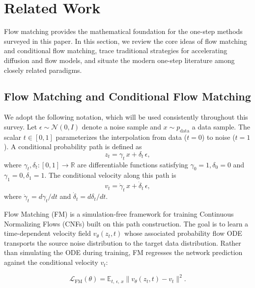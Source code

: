\section{Related Work}
\label{sec:related}

Flow matching provides the mathematical foundation for the one-step methods surveyed in this paper. In this section, we review the core ideas of flow matching and conditional flow matching, trace traditional strategies for accelerating diffusion and flow models, and situate the modern one-step literature among closely related paradigms.

\subsection{Flow Matching and Conditional Flow Matching}
\label{subsec:fm-cfm}

We adopt the following notation, which will be used consistently throughout this survey. Let $\epsilon \sim \mathcal{N}(0, I)$ denote a noise sample and $x \sim p_{\text{data}}$ a data sample. The scalar $t \in [0,1]$ parameterizes the interpolation from data ($t=0$) to noise ($t=1$). A conditional probability path is defined as
\begin{equation}
    z_t = \gamma_t \, x + \delta_t \, \epsilon,
    \label{eq:general-path}
\end{equation}
where $\gamma_t, \delta_t \colon [0,1] \to \mathbb{R}$ are differentiable functions satisfying $\gamma_0 = 1, \delta_0 = 0$ and $\gamma_1 = 0, \delta_1 = 1$. The conditional velocity along this path is
\begin{equation}
    v_t = \dot{\gamma}_t \, x + \dot{\delta}_t \, \epsilon,
    \label{eq:general-vel}
\end{equation}
where $\dot{\gamma}_t = d\gamma_t/dt$ and $\dot{\delta}_t = d\delta_t/dt$.

Flow Matching (FM) \citep{lipman2022flow} is a simulation-free framework for training Continuous Normalizing Flows (CNFs) built on this path construction. The goal is to learn a time-dependent velocity field $v_\theta(z_t, t)$ whose associated probability flow ODE transports the source noise distribution to the target data distribution. Rather than simulating the ODE during training, FM regresses the network prediction against the conditional velocity $v_t$:

\begin{equation}
    \mathcal{L}_{\text{FM}}(\theta) = \mathbb{E}_{t,\, \epsilon,\, x} \big\| v_\theta(z_t, t) - v_t \big\|^2.
    \label{eq:fm-loss}
\end{equation}

